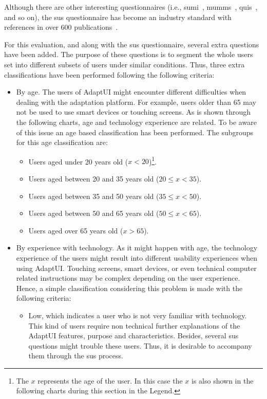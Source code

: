 Although there are other interesting questionnaires (i.e., \ac{sumi}~\citep{sumi},
\ac{mumms}~\citep{mumms}, \ac{quis}~\citep{quis}, and so on), the \ac{sus} 
questionnaire has become an industry standard with references in over 600 
publications~\citep{measuringusability}.

For this evaluation, and along with the \ac{sus} questionnaire, several extra 
questions have been added. The purpose of these questions is to segment the 
whole users set into different subsets of users under similar conditions. Thus, 
three extra classifications have been performed following the following 
criteria:

\begin{itemize}
  \item By age. The users of AdaptUI might encounter different difficulties when
  dealing with the adaptation platform. For example, users older than 65 may not
  be used to use smart devices or touching screens. As is shown through the 
  following charts, age and technology experience are related. To be aware of
  this issue an age based classification has been performed. The subgroups for
  this age classification are:
  \begin{itemize}
    \item Users aged under 20 years old ($x < 20$)\footnote{The $x$ represents
    the age of the user. In this case the $x$ is also shown in the following 
charts
    during this section in the Legend.}.
    \item Users aged between 20 and 35 years old ($20 \leq x < 35$).
    \item Users aged between 35 and 50 years old ($35 \leq x < 50$).
    \item Users aged between 50 and 65 years old ($50 \leq x < 65$).
    \item Users aged over 65 years old ($x > 65$).
  \end{itemize}

  \item By experience with technology. As it might happen with age, the 
  technology experience of the users might result into different usability 
  experiences when using AdaptUI. Touching screens, smart devices, or even 
  technical computer related instructions may be complex depending on the user 
  experience. Hence, a simple classification considering this problem is made 
  with the following criteria:
  
  \begin{itemize}
    \item Low, which indicates a user who is not very familiar with technology.
    This kind of users require non technical further explanations of the AdaptUI
    features, purpose and characteristics. Besides, several \ac{sus} questions might
    trouble these users. Thus, it is desirable to accompany them through the
    \ac{sus} process.
  

\end{itemize}
\end{itemize}
